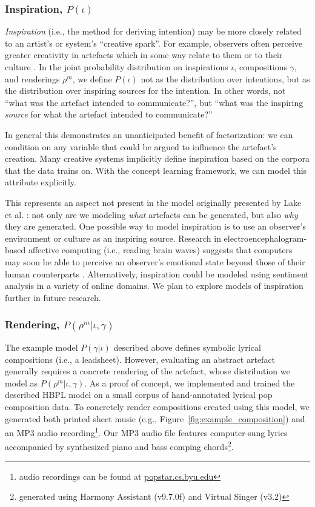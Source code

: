 \documentclass[phd,electronic,oneside,twosidetoc,letterpaper,chaptercenter,parttop,lol,lof,lot]{byumsphd}
\begin{document}
\subsubsection{Inspiration, $P(\iota)$}

\emph{Inspiration} (i.e., the method for deriving intention) may be more closely related to an artist's or system's ``creative spark''. For example, observers often perceive greater creativity in artefacts which in some way relate to them or to their culture \cite{colton2008creativity}. In the joint probability distribution on inspirations $\iota$, compositions $\gamma$, and renderings $\rho^{m}$, we define $P(\iota)$ not as the distribution over intentions, but as the distribution over inspiring sources for the intention. In other words, not ``what was the artefact intended to communicate?'', but ``what was the inspiring \emph{source} for what the artefact intended to communicate?''

In general this demonstrates an unanticipated benefit of factorization: we can condition on any variable that could be argued to influence the artefact's creation. Many creative systems implicitly define inspiration based on the corpora that the data trains on. With the concept learning framework, we can model this attribute explicitly.

This represents an aspect not present in the model originally presented by Lake et al. \cite{lake2015human}: not only are we modeling \textit{what} artefacts can be generated, but also \textit{why} they are generated. One possible way to model inspiration is to use an observer's environment or culture as an inspiring source. Research in electroencephalogram-based affective computing (i.e., reading brain waves) suggests that computers may soon be able to perceive an observer's emotional state beyond those of their human counterparts \cite{volioti2016mapping}. Alternatively, inspiration could be modeled using sentiment analysis in a variety of online domains. We plan to explore models of inspiration further in future research.

\subsubsection{Rendering, $P(\rho^{m}|\iota,\gamma)$}

The example model $P(\gamma|\iota)$ described above defines symbolic lyrical compositions (i.e., a leadsheet). However, evaluating an abstract artefact generally requires a concrete rendering of the artefact, whose distribution we model as $P(\rho^{m}|\iota,\gamma)$. As a proof of concept, we implemented and trained the described HBPL model on a small corpus of hand-annotated lyrical pop composition data. To concretely render compositions created using this model, we generated both printed sheet music (e.g., Figure~\ref{fig:example_composition}) and an MP3 audio recording\footnote{audio recordings can be found at \url{popstar.cs.byu.edu}}. Our MP3 audio file features computer-sung lyrics accompanied by synthesized piano and bass comping chords\footnote{generated using Harmony Assistant (v9.7.0f) and Virtual Singer (v3.2)}.
\end{document}
